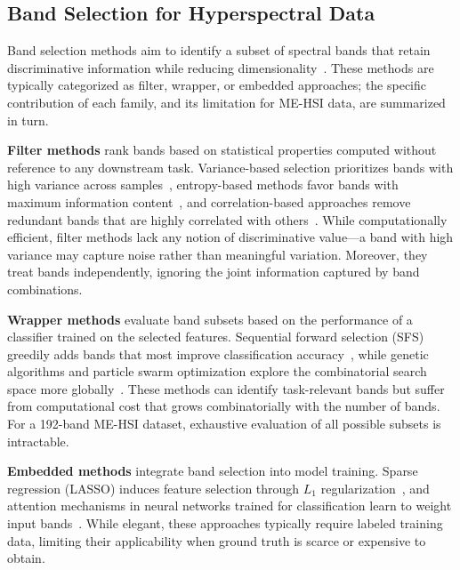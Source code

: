 \subsection{Band Selection for Hyperspectral Data}
\label{sec:related_band}

Band selection methods aim to identify a subset of spectral bands that retain discriminative information while reducing dimensionality~\cite{sun2019hyperspectral,rasti2020featureextraction}.
These methods are typically categorized as filter, wrapper, or embedded approaches; the specific contribution of each family, and its limitation for ME-HSI data, are summarized in turn.

\textbf{Filter methods} rank bands based on statistical properties computed without reference to any downstream task.
Variance-based selection prioritizes bands with high variance across samples~\cite{chang2000constrained}, entropy-based methods favor bands with maximum information content~\cite{guo2006band}, and correlation-based approaches remove redundant bands that are highly correlated with others~\cite{martinez2006comparison}.
While computationally efficient, filter methods lack any notion of discriminative value---a band with high variance may capture noise rather than meaningful variation.
Moreover, they treat bands independently, ignoring the joint information captured by band combinations.

\textbf{Wrapper methods} evaluate band subsets based on the performance of a classifier trained on the selected features.
Sequential forward selection (SFS) greedily adds bands that most improve classification accuracy~\cite{pudil1994floating}, while genetic algorithms and particle swarm optimization explore the combinatorial search space more globally~\cite{pal2010feature}.
These methods can identify task-relevant bands but suffer from computational cost that grows combinatorially with the number of bands.
For a 192-band ME-HSI dataset, exhaustive evaluation of all possible subsets is intractable.

\textbf{Embedded methods} integrate band selection into model training.
Sparse regression (LASSO) induces feature selection through $L_1$ regularization~\cite{tibshirani1996regression}, and attention mechanisms in neural networks trained for classification learn to weight input bands~\cite{lorenzo2020attention}.
While elegant, these approaches typically require labeled training data, limiting their applicability when ground truth is scarce or expensive to obtain.

